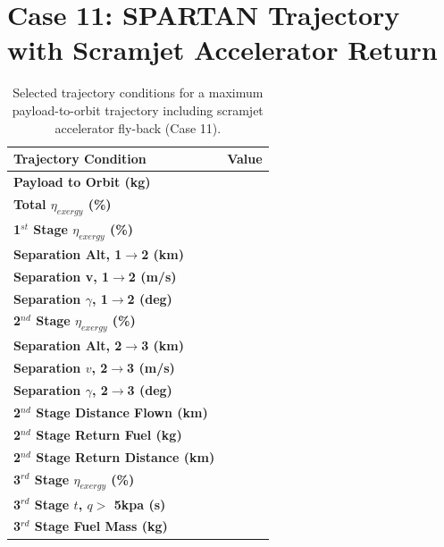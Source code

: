 \section{Case 11: SPARTAN Trajectory with Scramjet Accelerator Return}
\begin{table}[ht] %
	\centering
\begin{tabular}{l c } 
	\hline \textbf{Trajectory Condition}
	&Value 
	\\
	\hline \textbf{Payload to Orbit (kg)}
	& \textbf{\PayloadToOrbitStandard}
	\\
	\textbf{Total $\eta_{exergy}$ (\%)}
	& \textbf{\totalExergyEffStandard}
	\\
	\hline 
	\textbf{1$^{st}$ Stage $\eta_{exergy}$ (\%)}
	& \textbf{\firstExergyEffStandard}
	\\

	\textbf{Separation Alt, 1$\rightarrow$2 (km)}
	& \firstsecondSeparationAltStandard
	\\
	\textbf{Separation v, 1$\rightarrow$2 (m/s)}
	& \firstsecondSeparationvStandard
	\\
	\textbf{Separation $\gamma$, 1$\rightarrow$2 (deg)}
	& \firstsecondSeparationgammaStandard
	\\
	\hline 
	\textbf{2$^{nd}$ Stage $\eta_{exergy}$ (\%)}
	& \textbf{\secondExergyEffStandard}
	\\

	\textbf{Separation Alt, 2$\rightarrow$3 (km)}
	& \secondthirdSeparationAltStandard
	\\
	\textbf{Separation $v$, 2$\rightarrow$3 (m/s)}
	& \secondthirdSeparationvStandard
	\\
	\textbf{Separation $\gamma$, 2$\rightarrow$3 (deg)}
	& \secondthirdSeparationgammaStandard
	\\

	\textbf{2$^{nd}$ Stage Distance Flown (km)}
	& \SecondDistStandard
	\\
	\textbf{2$^{nd}$ Stage Return Fuel (kg)}
	& \returnFuelStandard
	\\
	\textbf{2$^{nd}$ Stage Return Distance (km)}
	& \returnDistStandard
	\\
	\hline 
	\textbf{3$^{rd}$ Stage $\eta_{exergy}$ (\%)}
	& \textbf{\thirddExergyEffStandard}
	\\

	\textbf{3$^{rd}$ Stage $t$, $q >$ 5kpa (s)}
	& \thirdqOverFiveStandard
	\\
	\textbf{3$^{rd}$ Stage Fuel Mass (kg)}
	& \thirdmFuelStandard
	\\
	\hline 
\end{tabular} 
\caption{Selected trajectory conditions for a maximum payload-to-orbit trajectory including scramjet accelerator fly-back (Case 11).}
\end{table}

